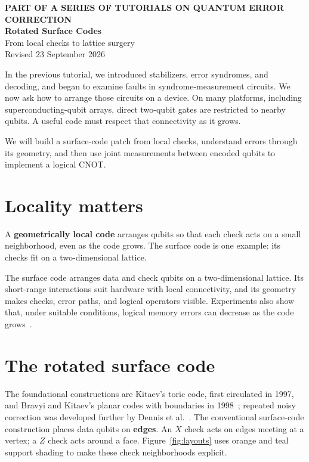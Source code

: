 \documentclass[11pt,a4paper]{article}
\begin{document}
\begin{center}
{\small\color{teal}\textbf{PART OF A SERIES OF TUTORIALS ON QUANTUM ERROR CORRECTION}}\\[9pt]
{\LARGE\bfseries\color{ink} Rotated Surface Codes}\\[10pt]
{\large From local checks to lattice surgery}\\[9pt]
{\small Revised 23 September 2026}
\end{center}
\vspace{3pt}
In the previous tutorial, we introduced stabilizers, error syndromes, and decoding, and began to examine faults in syndrome-measurement circuits. We now ask how to arrange those circuits on a device. On many platforms, including superconducting-qubit arrays, direct two-qubit gates are restricted to nearby qubits. A useful code must respect that connectivity as it grows.

We will build a surface-code patch from local checks, understand errors through its geometry, and then use joint measurements between encoded qubits to implement a logical CNOT.

\section{Locality matters}
A \textbf{geometrically local code} arranges qubits so that each check acts on a small neighborhood, even as the code grows. The surface code is one example: its checks fit on a two-dimensional lattice.

The surface code arranges data and check qubits on a two-dimensional lattice. Its short-range interactions suit hardware with local connectivity, and its geometry makes checks, error paths, and logical operators visible. Experiments also show that, under suitable conditions, logical memory errors can decrease as the code grows~\cite{google}.

\section{The rotated surface code}
The foundational constructions are Kitaev's toric code, first circulated in 1997, and Bravyi and Kitaev's planar codes with boundaries in 1998~\cite{kitaev,bravyi}; repeated noisy correction was developed further by Dennis et al.~\cite{dennis}. The conventional surface-code construction places data qubits on \textbf{edges}. An $X$ check acts on edges meeting at a vertex; a $Z$ check acts around a face. Figure~\ref{fig:layouts} uses orange and teal support shading to make these check neighborhoods explicit.
\end{document}
